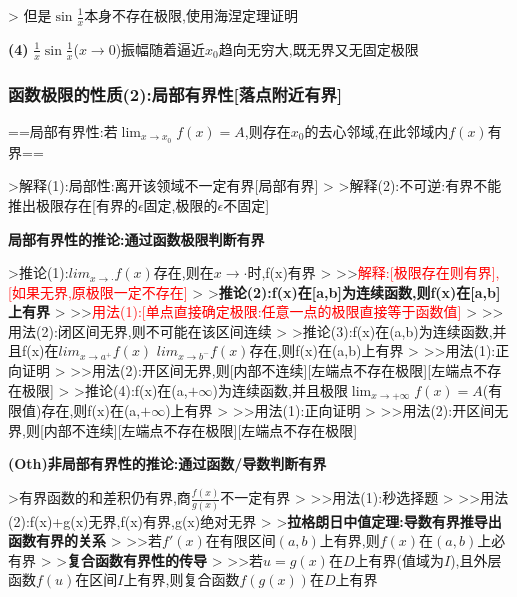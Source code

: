 \documentclass[11pt,a4paper,UTF8]{ctexart}
\begin{document}
\begin{solbox}[{分步推导与答题规范}]
    >   但是$\sin\frac{1}{x}$本身不存在极限,使用海涅定理证明
\end{solbox}

\textbf{(4)} $\frac{1}{x} \sin\frac{1}{x}$($x \to 0$)振幅随着逼近$x_0$趋向无穷大,既无界又无固定极限


\subsubsection{函数极限的性质(2):局部有界性[落点附近有界]}

    ==\textit{}局部有界性:若$\lim_{x \to x_0} f(x) = A$,则存在$x_0$的去心邻域,在此邻域内$f(x)$有界\textit{}==

\begin{solbox}[{分步推导与答题规范}]
    >解释(1):局部性:离开该领域不一定有界[局部有界]
    >
    >解释(2):不可逆:有界不能推出极限存在[有界的$\epsilon$固定,极限的$\epsilon$不固定]
\end{solbox}

    \textbf{局部有界性的推论:通过函数极限判断有界}

\begin{solbox}[{分步推导与答题规范}]
    >\textit{}推论(1):$lim _{x\rightarrow \cdot}f(x)$存在,则在$x\rightarrow \cdot$时,f(x)有界\textit{}
    >
    >>\textcolor{red}{解释:[极限存在则有界],[如果无界,原极限一定不存在]}
    >
    >\textbf{推论(2):f(x)在[a,b]为连续函数,则f(x)在[a,b]上有界}
    >
    >>\textcolor{red}{用法(1):[单点直接确定极限:任意一点的极限直接等于函数值]}
    >
    >>用法(2):闭区间无界,则不可能在该区间连续
    >
    >\textit{}推论(3):f(x)在(a,b)为连续函数,并且f(x)在$lim _{x\rightarrow a^+}f(x)$ $lim _{x\rightarrow b^-}f(x)$存在,则f(x)在(a,b)上有界\textit{}
    >
    >>用法(1):正向证明
    >
    >>用法(2):开区间无界,则[内部不连续][左端点不存在极限][左端点不存在极限]
    >
    >\textit{}推论(4):f(x)在(a,$+\infty$)为连续函数,并且极限$\lim_{x \to +\infty} f(x) = A$(有限值)存在,则f(x)在(a,$+\infty$)上有界\textit{}
    >
    >>用法(1):正向证明
    >
    >>用法(2):开区间无界,则[内部不连续][左端点不存在极限][左端点不存在极限]
\end{solbox}

    \textbf{(Oth)非局部有界性的推论:通过函数/导数判断有界}

\begin{solbox}[{分步推导与答题规范}]
    >\textit{}有界函数的和差积仍有界,商$\frac{f(x)}{g(x)}$不一定有界\textit{}
    >
    >>用法(1):秒选择题
    >
    >>用法(2):f(x)+g(x)无界,f(x)有界,g(x)绝对无界
    >
    >\textbf{拉格朗日中值定理:导数有界推导出函数有界的关系}
    >
    >>若$f'(x)$在有限区间$(a,b)$上有界,则$f(x)$在$(a,b)$上必有界
    >
    >\textbf{复合函数有界性的传导}
    >
    >>若$u = g(x)$在$D$上有界(值域为$I$),且外层函数$f(u)$在区间$I$上有界,则复合函数$f(g(x))$在$D$上有界
\end{solbox}
\end{document}
